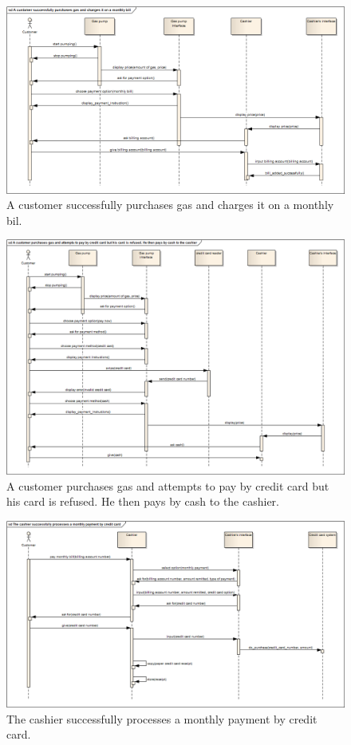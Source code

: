 \documentclass[11pt,a4paper]{article}
\begin{document}
\begin{figure}[H]
 \centering
 \includegraphics[width=\textwidth]{../sequence1.png} 
 \caption{A customer successfully purchases gas and charges it on a monthly bil.}
 \label{fig:sequence1}
\end{figure}

\begin{figure}[H]
 \centering
 \includegraphics[width=\textwidth]{../sequence2.png} 
 \caption{A customer purchases gas and attempts to pay by credit card but his card is refused. He then pays by cash to the cashier.}
 \label{fig:sequence2}
\end{figure}

\begin{figure}[H]
 \centering
 \includegraphics[width=\textwidth]{../sequence3.png} 
 \caption{The cashier successfully processes a monthly payment by credit card.}
 \label{fig:sequence3}
\end{figure}
\end{document}
